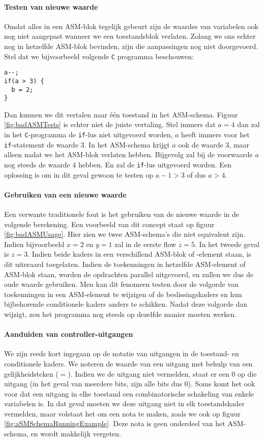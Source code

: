 \paragraph{Testen van nieuwe waarde} Omdat alles in een ASM-blok tegelijk gebeurt zijn de waardes van variabelen ook nog niet aangepast wanneer we een toestandsblok verlaten. Zolang we ons echter nog in hetzelfde ASM-blok bevinden, zijn die aanpassingen nog niet doorgevoerd. Stel dat we bijvoorbeeld volgende \texttt{C} programma beschouwen:
\begin{verbatim}
a--;
if(a > 3) {
  b = 2;
}
\end{verbatim}
Dan kunnen we dit vertalen naar \'e\'en toestand in het ASM-schema. Figuur \ref{fig:badASMTests} is echter niet de juiste vertaling. Stel immers dat $a=4$ dan zal in het \texttt{C}-programma de \texttt{if}-lus niet uitgevoerd worden, $a$ heeft immers voor het \texttt{if}-statement de waarde $3$. In het ASM-schema krijgt $a$ ook de waarde $3$, maar alleen nadat we het ASM-blok verlaten hebben. Bijgevolg zal bij de voorwaarde $a$ nog steeds de waarde $4$ hebben. En zal de \texttt{if}-lus uitgevoerd worden. Een oplossing is om in dit geval gewoon te testen op $a-1>3$ of dus $a>4$.
\paragraph{Gebruiken van een nieuwe waarde} Een verwante traditionele fout is het gebruiken van de nieuwe waarde in de volgende berekening. Een voorbeeld van dit concept staat op figuur \ref{fig:badASMUsage}. Hier zien we twee ASM-schema's die niet equivalent zijn. Indien bijvoorbeeld $x=2$ en $y=1$ zal in de eerste flow $z=5$. In het tweede geval is $z=3$. Indien beide kaders in een verschillend ASM-blok of -element staan, is dit uiteraard toegelaten. Indien de toekenningen in hetzelfde ASM-element of ASM-blok staan, worden de opdrachten parallel uitgevoerd, en zullen we dus de oude waarde gebruiken. Men kan dit fenomeen testen door de volgorde van toekenningen in een ASM-element te wijzigen of de beslissingskaders en hun bijbehorende conditionele kaders anders te schikken. Nadat deze volgorde dan wijzigt, zou het programma nog steeds op dezelfde manier moeten werken.
\paragraph{Aanduiden van controller-uitgangen}We zijn reeds kort ingegaan op de notatie van uitgangen in de toestand- en conditionele kaders. We noteren de waarde van een uitgang met behulp van een gelijkheidsteken ($=$). Indien we de uitgang niet vermelden, staat er een 0 op die uitgang (in het geval van meerdere bits, zijn alle bits dus 0). Soms komt het ook voor dat een uitgang in elke toestand een combinatorische schakeling van enkele variabelen is. In dat geval moeten we deze uitgang niet in elk toestandskader vermelden, maar volstaat het om een nota te maken, zoals we ook op figuur \ref{fig:aSMSchemaRunningExample}. Deze nota is geen onderdeel van het ASM-schema, en wordt makkelijk vergeten.

